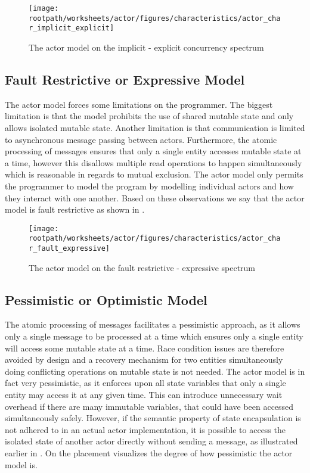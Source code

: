 \begin{figure}[htbp]
\centering
 \texttt{[image: \\rootpath/worksheets/actor/figures/characteristics/actor\_char\_implicit\_explicit]} 
 \caption{The actor model on the implicit - explicit concurrency spectrum}
\label{fig:actor_implicit_explicit}
\end{figure}
\subsection{Fault Restrictive or Expressive Model}\label{sec_actor_fault_express}
The actor model forces some limitations on the programmer. The biggest limitation is that the model prohibits the use of shared mutable state and only allows isolated mutable state. Another limitation is that communication is limited to asynchronous message passing between actors. Furthermore, the atomic processing of messages ensures that only a single entity accesses mutable state at a time, however this disallows multiple read operations to happen simultaneously which is reasonable in regards to mutual exclusion. The actor model only permits the programmer to model the program by modelling individual actors and how they interact with one another. Based on these observations we say that the actor model is fault restrictive as shown in .

\begin{figure}[htbp]
\centering
 \texttt{[image: \\rootpath/worksheets/actor/figures/characteristics/actor\_char\_fault\_expressive]} 
 \caption{The actor model on the fault restrictive - expressive spectrum}
\label{fig:actor_fault_expressive}
\end{figure}

\subsection{Pessimistic or Optimistic Model}
The atomic processing of messages facilitates a pessimistic approach, as it allows only a single message to be processed at a time which ensures only a single entity will access some mutable state at a time. Race condition issues are therefore avoided by design and a recovery mechanism for two entities simultaneously doing conflicting operations on mutable state is not needed. The actor model is in fact very pessimistic, as it enforces upon all state variables that only a single entity may access it at any given time. This can introduce unnecessary wait overhead if there are many immutable variables, that could have been accessed simultaneously safely. However, if the semantic property of state encapsulation is not adhered to in an actual actor implementation, it is possible to access the isolated state of another actor directly without sending a message, as illustrated earlier in . On  the placement visualizes the degree of how pessimistic the actor model is.

